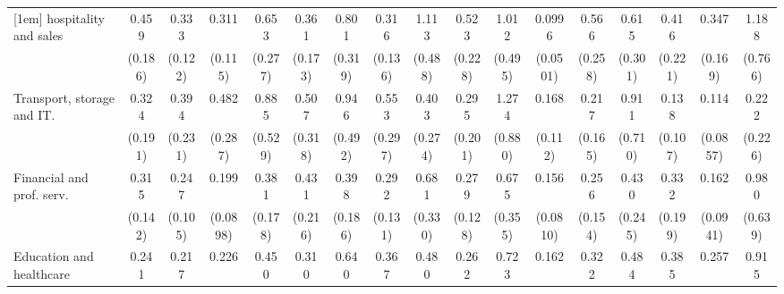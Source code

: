{\begin{tabular}{l*{16}{c}}
[1em]
hospitality and sales&       0.459         &       0.333\sym{**} &       0.311\sym{**} &       0.653         &       0.361\sym{*}  &       0.801         &       0.316\sym{**} &       1.113         &       0.523         &       1.012         &      0.0996\sym{***}&       0.566         &       0.615         &       0.416         &       0.347\sym{*}  &       1.188         \\
                    &     (0.186)         &     (0.122)         &     (0.115)         &     (0.277)         &     (0.173)         &     (0.319)         &     (0.136)         &     (0.488)         &     (0.228)         &     (0.495)         &    (0.0501)         &     (0.258)         &     (0.301)         &     (0.221)         &     (0.169)         &     (0.766)         \\
[1em]
Transport, storage and IT.&       0.324         &       0.394         &       0.482         &       0.885         &       0.507         &       0.946         &       0.553         &       0.403         &       0.295         &       1.274         &       0.168\sym{**} &       0.217\sym{*}  &       0.911         &       0.138\sym{*}  &       0.114\sym{**} &       0.222         \\
                    &     (0.191)         &     (0.231)         &     (0.287)         &     (0.529)         &     (0.318)         &     (0.492)         &     (0.297)         &     (0.274)         &     (0.201)         &     (0.880)         &     (0.112)         &     (0.165)         &     (0.710)         &     (0.107)         &    (0.0857)         &     (0.226)         \\
[1em]
Financial and prof. serv.&       0.315\sym{*}  &       0.247\sym{**} &       0.199\sym{***}&       0.381\sym{*}  &       0.431         &       0.398\sym{*}  &       0.292\sym{**} &       0.681         &       0.279\sym{**} &       0.675         &       0.156\sym{***}&       0.256\sym{*}  &       0.430         &       0.332         &       0.162\sym{**} &       0.980         \\
                    &     (0.142)         &     (0.105)         &    (0.0898)         &     (0.178)         &     (0.216)         &     (0.186)         &     (0.131)         &     (0.330)         &     (0.128)         &     (0.355)         &    (0.0810)         &     (0.154)         &     (0.245)         &     (0.199)         &    (0.0941)         &     (0.639)         \\
[1em]
Education and healthcare&       0.241\sym{**} &       0.217\sym{***}&       0.226\sym{***}&       0.450         &       0.310\sym{*}  &       0.640         &       0.367\sym{*}  &       0.480         &       0.262\sym{**} &       0.723         &       0.162\sym{***}&       0.322\sym{*}  &       0.484         &       0.385         &       0.257\sym{*}  &       0.915         \\

\end{tabular}}
